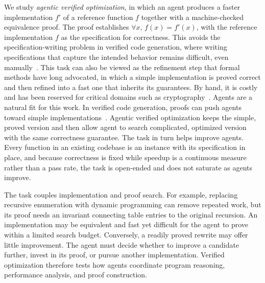 \documentclass{article}
\begin{document}
We study \emph{agentic verified optimization}, in which an agent produces a faster implementation $f'$ of a reference function $f$ together with a machine-checked equivalence proof.
The proof establishes $\forall x,\, f(x)=f'(x)$, with the reference implementation $f$ as the specification for correctness.
This avoids the specification-writing problem in verified code generation, where writing specifications that capture the intended behavior remains difficult, even manually~\citep{endres2024can,ye2026intent,ma2025specgen}.
This task can also be viewed as the refinement step that formal methods have long advocated, in which a simple implementation is proved correct and then refined into a fast one that inherits its guarantees.
By hand, it is costly and has been reserved for critical domains such as cryptography~\citep{erbsen2019simple}.
Agents are a natural fit for this work.
In verified code generation, proofs can push agents toward simple implementations~\citep{ye2026vero}.
Agentic verified optimization keeps the simple, proved version and then allow agent to search complicated, optimized version with the same correctness guarantee.
The task in turn helps improve agents.
Every function in an existing codebase is an instance with its specification in place, and because correctness is fixed while speedup is a continuous measure rather than a pass rate, the task is open-ended and does not saturate as agents improve.

The task couples implementation and proof search.
For example, replacing recursive enumeration with dynamic programming can remove repeated work, but its proof needs an invariant connecting table entries to the original recursion.
An implementation may be equivalent and fast yet difficult for the agent to prove within a limited search budget.
Conversely, a readily proved rewrite may offer little improvement.
The agent must decide whether to improve a candidate further, invest in its proof, or pursue another implementation.
Verified optimization therefore tests how agents coordinate program reasoning, performance analysis, and proof construction.
\end{document}
